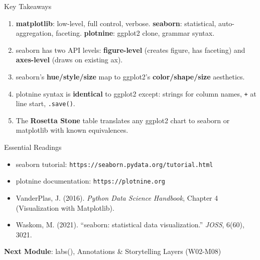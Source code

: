 \documentclass[10pt]{beamer}
\begin{document}
\begin{frame}{Key Takeaways}
  \begin{enumerate}
    \item \textbf{matplotlib}: low-level, full control, verbose.
          \textbf{seaborn}: statistical, auto-aggregation, faceting.
          \textbf{plotnine}: ggplot2 clone, grammar syntax.
    \item seaborn has two API levels: \textbf{figure-level} (creates figure,
          has faceting) and \textbf{axes-level} (draws on existing ax).
    \item seaborn's \textbf{hue/style/size} map to ggplot2's
          \textbf{color/shape/size} aesthetics.
    \item plotnine syntax is \textbf{identical} to ggplot2 except: strings
          for column names, \texttt{+} at line start, \texttt{.save()}.
    \item The \textbf{Rosetta Stone} table translates any ggplot2 chart
          to seaborn or matplotlib with known equivalences.
  \end{enumerate}
\end{frame}

\begin{frame}{Essential Readings}
  \begin{itemize}
    \item seaborn tutorial: \texttt{https://seaborn.pydata.org/tutorial.html}
    \item plotnine documentation: \texttt{https://plotnine.org}
    \item VanderPlas, J. (2016). \emph{Python Data Science Handbook},
          Chapter 4 (Visualization with Matplotlib).
    \item Waskom, M. (2021). ``seaborn: statistical data visualization.''
          \emph{JOSS}, 6(60), 3021.
  \end{itemize}
  \vspace{6pt}
  \textbf{Next Module}: labs(), Annotations \& Storytelling Layers (W02-M08)
\end{frame}
\end{document}
